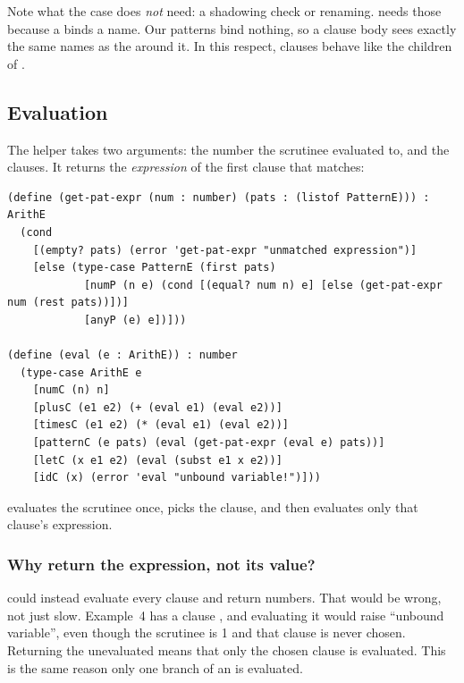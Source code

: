 Note what the  case does \emph{not} need: a shadowing check or renaming.  needs those because a  binds a name. Our patterns bind nothing, so a clause body sees exactly the same names as the  around it. In this respect, clauses behave like the children of .

\subsection{Evaluation}

The helper  takes two arguments: the number the scrutinee evaluated to, and the clauses. It returns the \emph{expression} of the first clause that matches:
\begin{lstlisting}
(define (get-pat-expr (num : number) (pats : (listof PatternE))) : ArithE
  (cond
    [(empty? pats) (error 'get-pat-expr "unmatched expression")]
    [else (type-case PatternE (first pats)
            [numP (n e) (cond [(equal? num n) e] [else (get-pat-expr num (rest pats))])]
            [anyP (e) e])]))

(define (eval (e : ArithE)) : number
  (type-case ArithE e
    [numC (n) n]
    [plusC (e1 e2) (+ (eval e1) (eval e2))]
    [timesC (e1 e2) (* (eval e1) (eval e2))]
    [patternC (e pats) (eval (get-pat-expr (eval e) pats))]
    [letC (x e1 e2) (eval (subst e1 x e2))]
    [idC (x) (error 'eval "unbound variable!")]))
\end{lstlisting}
 evaluates the scrutinee once, picks the clause, and then evaluates only that clause's expression.

\subsubsection{Why return the expression, not its value?}  could instead evaluate every clause and return numbers. That would be wrong, not just slow. Example~4 has a clause , and evaluating it would raise ``unbound variable'', even though the scrutinee is 1 and that clause is never chosen. Returning the unevaluated  means that only the chosen clause is evaluated. This is the same reason only one branch of an  is evaluated.

